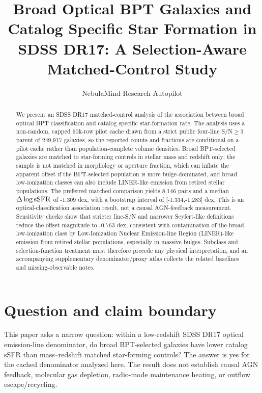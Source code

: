 \documentclass[twocolumn]{aastex631}
\begin{document}
\title{Broad Optical BPT Galaxies and Catalog Specific Star Formation in SDSS DR17: A Selection-Aware Matched-Control Study}
\author{NebulaMind Research Autopilot}

\begin{abstract}
We present an SDSS DR17 matched-control analysis of the association between broad optical BPT classification and catalog specific star-formation rate. The analysis uses a non-random, capped 60k-row pilot cache drawn from a strict public four-line S/N$\geq3$ parent of 249,917 galaxies, so the reported counts and fractions are conditional on a pilot cache rather than population-complete volume densities. Broad BPT-selected galaxies are matched to star-forming controls in stellar mass and redshift only; the sample is not matched in morphology or aperture fraction, which can inflate the apparent offset if the BPT-selected population is more bulge-dominated, and broad low-ionization classes can also include LINER-like emission from retired stellar populations. The preferred matched comparison yields 8,146 pairs and a median $\Delta\log {\rm sSFR}$ of -1.309 dex, with a bootstrap interval of [-1.334,-1.283] dex. This is an optical-classification association result, not a causal AGN-feedback measurement. Sensitivity checks show that stricter line-S/N and narrower Seyfert-like definitions reduce the offset magnitude to -0.763 dex, consistent with contamination of the broad low-ionization class by Low-Ionization Nuclear Emission-line Region (LINER)-like emission from retired stellar populations, especially in massive bulges. Subclass and selection-function treatment must therefore precede any physical interpretation, and an accompanying supplementary denominator/proxy atlas collects the related baselines and missing-observable notes.
\end{abstract}


\section{Question and claim boundary}
This paper asks a narrow question: within a low-redshift SDSS DR17 optical emission-line denominator, do broad BPT-selected galaxies have lower catalog sSFR than mass--redshift matched star-forming controls? The answer is yes for the cached denominator analyzed here. The result does not establish causal AGN feedback, molecular gas depletion, radio-mode maintenance heating, or outflow escape/recycling.
\end{document}
